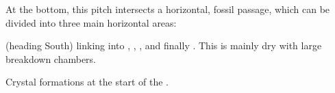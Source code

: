 At the bottom, this pitch intersects a horizontal, fossil passage, which can be divided into three main horizontal areas:

\textbf{} (heading South) linking into ,
, ,  and
finally . This is mainly dry with large breakdown
chambers.

    \begin{marginfigure}
\checkoddpage \ifoddpage \forcerectofloat \else \forceversofloat \fi
\centering
\caption{Crystal formations at the start of the \protect{}. } \label{Minos crystals 1}
\end{marginfigure}


